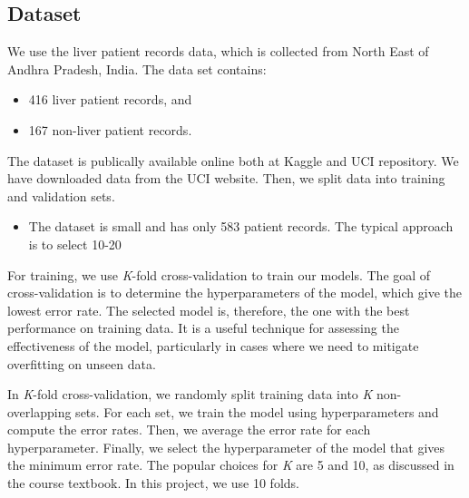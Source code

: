 \documentclass[]{article}
\begin{document}
\subsection{Dataset}
\label{sec:dataset}

We use the liver patient records data, which is collected from North
East of Andhra Pradesh, India. The data set contains:

\begin{itemize}
\item 416 liver patient records, and 
\item 167 non-liver patient records.
\end{itemize}

The dataset is publically available online both at Kaggle and UCI
repository. We have downloaded data from the UCI website. Then, we split
data into training and validation sets.

\begin{itemize}
\item The dataset is small and has only 583 patient records. The typical approach is to select 10-20%
\end{itemize}

For training, we use \emph{K}-fold cross-validation to train our models.
The goal of cross-validation is to determine the hyperparameters of the
model, which give the lowest error rate. The selected model is,
therefore, the one with the best performance on training data. It is a
useful technique for assessing the effectiveness of the model,
particularly in cases where we need to mitigate overfitting on unseen
data.

In \emph{K}-fold cross-validation, we randomly split training data into
\emph{K} non-overlapping sets. For each set, we train the model using
hyperparameters and compute the error rates. Then, we average the error
rate for each hyperparameter. Finally, we select the hyperparameter of
the model that gives the minimum error rate. The popular choices for
\emph{K} are 5 and 10, as discussed in the course textbook. In this
project, we use 10 folds.
\end{document}
